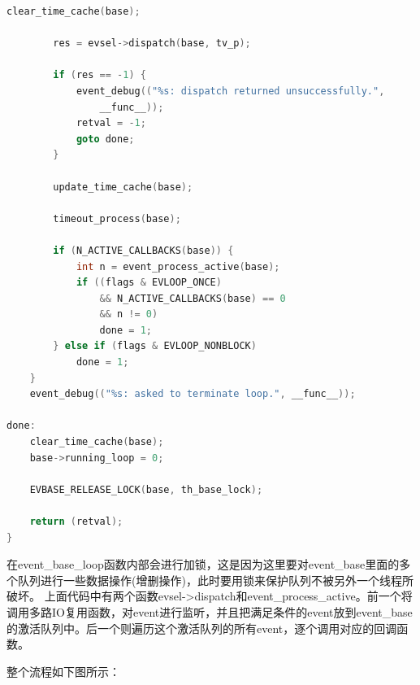 \documentclass[11pt,a4paper]{article}
\begin{document}
\begin{lstlisting}[language=C]
		clear_time_cache(base);

		res = evsel->dispatch(base, tv_p);

		if (res == -1) {
			event_debug(("%s: dispatch returned unsuccessfully.",
				__func__));
			retval = -1;
			goto done;
		}

		update_time_cache(base);

		timeout_process(base);

		if (N_ACTIVE_CALLBACKS(base)) {
			int n = event_process_active(base);
			if ((flags & EVLOOP_ONCE)
			    && N_ACTIVE_CALLBACKS(base) == 0
			    && n != 0)
				done = 1;
		} else if (flags & EVLOOP_NONBLOCK)
			done = 1;
	}
	event_debug(("%s: asked to terminate loop.", __func__));

done:
	clear_time_cache(base);
	base->running_loop = 0;

	EVBASE_RELEASE_LOCK(base, th_base_lock);

	return (retval);
}
\end{lstlisting}
在event\_base\_loop函数内部会进行加锁，这是因为这里要对event\_base里面的多个队列进行一些数据操作(增删操作)，此时要用锁来保护队列不被另外一个线程所破坏。
上面代码中有两个函数evsel->dispatch和event\_process\_active。前一个将调用多路IO复用函数，对event进行监听，并且把满足条件的event放到event\_base的激活队列中。后一个则遍历这个激活队列的所有event，逐个调用对应的回调函数。


整个流程如下图所示：
\end{document}
